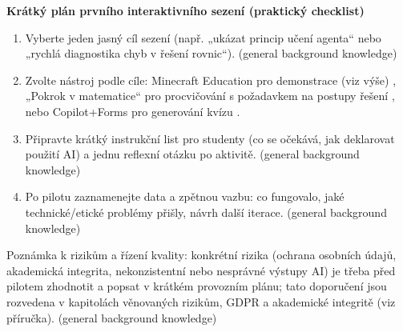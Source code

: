 \smallskip
\textbf{Krátký plán prvního interaktivního sezení (praktický checklist)}  
\begin{enumerate}
  \item Vyberte jeden jasný cíl sezení (např. „ukázat princip učení agenta“ nebo „rychlá diagnostika chyb v řešení rovnic“). (general background knowledge)
  \item Zvolte nástroj podle cíle: Minecraft Education pro demonstrace (viz výše) \cite{kb_ai_101_tipu_pdf_04e4a115_page_15_2}, „Pokrok v matematice“ pro procvičování s požadavkem na postupy řešení \cite{kb_ai_101_tipu_pdf_04e4a115_page_8_1}, nebo Copilot+Forms pro generování kvízu \cite{kb_ai_101_tipu_pdf_04e4a115_page_36_1}.
  \item Připravte krátký instrukční list pro studenty (co se očekává, jak deklarovat použití AI) a jednu reflexní otázku po aktivitě. (general background knowledge)
  \item Po pilotu zaznamenejte data a zpětnou vazbu: co fungovalo, jaké technické/etické problémy přišly, návrh další iterace. (general background knowledge)
\end{enumerate}

\smallskip
Poznámka k rizikům a řízení kvality: konkrétní rizika (ochrana osobních údajů, akademická integrita, nekonzistentní nebo nesprávné výstupy AI) je třeba před pilotem zhodnotit a popsat v krátkém provozním plánu; tato doporučení jsou rozvedena v kapitolách věnovaných rizikům, GDPR a akademické integritě (viz příručka). (general background knowledge)